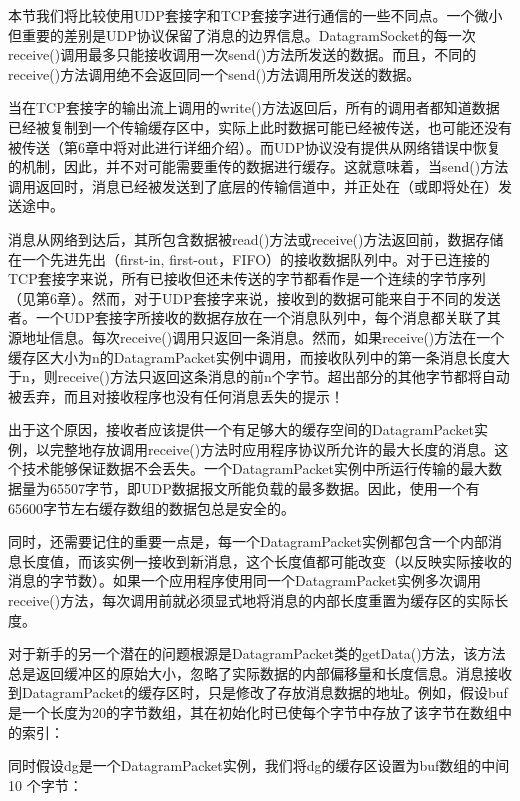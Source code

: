 		本节我们将比较使用UDP套接字和TCP套接字进行通信的一些不同点。一个微小但重要的差别是UDP协议保留了消息的边界信息。DatagramSocket的每一次receive()调用最多只能接收调用一次send()方法所发送的数据。而且，不同的receive()方法调用绝不会返回同一个send()方法调用所发送的数据。 

		当在TCP套接字的输出流上调用的write()方法返回后，所有的调用者都知道数据已经被复制到一个传输缓存区中，实际上此时数据可能已经被传送，也可能还没有被传送（第6章中将对此进行详细介绍）。而UDP协议没有提供从网络错误中恢复的机制，因此，并不对可能需要重传的数据进行缓存。这就意味着，当send()方法调用返回时，消息已经被发送到了底层的传输信道中，并正处在（或即将处在）发送途中。 

		消息从网络到达后，其所包含数据被read()方法或receive()方法返回前，数据存储在一个先进先出（first-in, first-out，FIFO）的接收数据队列中。对于已连接的TCP套接字来说，所有已接收但还未传送的字节都看作是一个连续的字节序列（见第6章）。然而，对于UDP套接字来说，接收到的数据可能来自于不同的发送者。一个UDP套接字所接收的数据存放在一个消息队列中，每个消息都关联了其源地址信息。每次receive()调用只返回一条消息。然而，如果receive()方法在一个缓存区大小为n的DatagramPacket实例中调用，而接收队列中的第一条消息长度大于n，则receive()方法只返回这条消息的前n个字节。超出部分的其他字节都将自动被丢弃，而且对接收程序也没有任何消息丢失的提示！ 

		出于这个原因，接收者应该提供一个有足够大的缓存空间的DatagramPacket实例，以完整地存放调用receive()方法时应用程序协议所允许的最大长度的消息。这个技术能够保证数据不会丢失。一个DatagramPacket实例中所运行传输的最大数据量为65507字节，即UDP数据报文所能负载的最多数据。因此，使用一个有65600字节左右缓存数组的数据包总是安全的。 

		同时，还需要记住的重要一点是，每一个DatagramPacket实例都包含一个内部消息长度值，而该实例一接收到新消息，这个长度值都可能改变（以反映实际接收的消息的字节数）。如果一个应用程序使用同一个DatagramPacket实例多次调用receive()方法，每次调用前就必须显式地将消息的内部长度重置为缓存区的实际长度。 

		对于新手的另一个潜在的问题根源是DatagramPacket类的getData()方法，该方法总是返回缓冲区的原始大小，忽略了实际数据的内部偏移量和长度信息。消息接收到DatagramPacket的缓存区时，只是修改了存放消息数据的地址。例如，假设buf是一个长度为20的字节数组，其在初始化时已使每个字节中存放了该字节在数组中的索引： 

		

		同时假设dg是一个DatagramPacket实例，我们将dg的缓存区设置为buf数组的中间10 个字节： 

